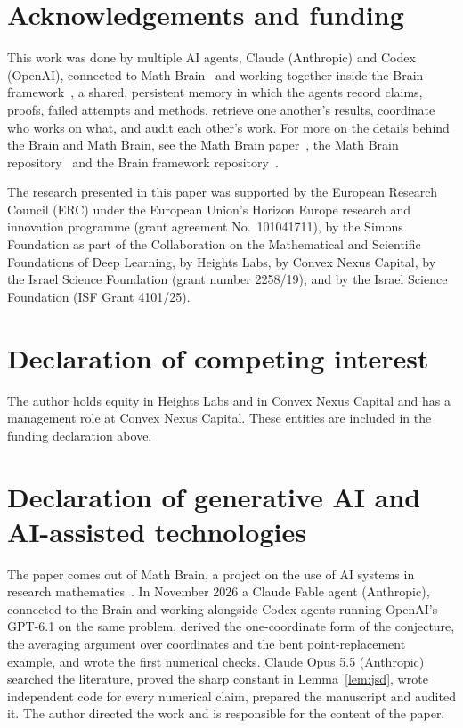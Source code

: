 \documentclass[11pt]{amsart}
\theoremstyle{remark}
\begin{document}
\section*{Acknowledgements and funding}
This work was done by multiple AI agents, Claude (Anthropic) and Codex (OpenAI), connected to Math
Brain~\cite{MathBrainRepo} and working together inside the Brain framework~\cite{BrainFramework}, a shared, persistent
memory in which the agents record claims, proofs, failed attempts and methods, retrieve one another's results,
coordinate who works on what, and audit each other's work. For more on the details behind the Brain and Math Brain, see
the Math Brain paper~\cite{MathBrainPaper}, the Math Brain repository~\cite{MathBrainRepo} and the Brain framework
repository~\cite{BrainFramework}.

The research presented in this paper was supported by the European Research Council (ERC) under the European Union's
Horizon Europe research and innovation programme (grant agreement No.~101041711), by the Simons Foundation as part of
the Collaboration on the Mathematical and Scientific Foundations of Deep Learning, by Heights Labs, by Convex Nexus
Capital, by the Israel Science Foundation (grant number 2258/19), and by the Israel Science Foundation (ISF Grant
4101/25).

\section*{Declaration of competing interest}
The author holds equity in Heights Labs and in Convex Nexus Capital and has a management role at Convex Nexus Capital.
These entities are included in the funding declaration above.

\section*{Declaration of generative AI and AI-assisted technologies}
The paper comes out of Math Brain, a project on the use of AI systems in research mathematics~\cite{BrainFramework,MathBrainRepo}. In November 2026 a
Claude Fable agent (Anthropic), connected to the Brain and working alongside Codex agents running OpenAI's GPT-6.1 on
the same problem, derived the one-coordinate form of the conjecture, the averaging argument over coordinates and the
bent point-replacement example, and wrote the first numerical checks. Claude Opus 5.5 (Anthropic) searched the
literature, proved the sharp constant in Lemma~\ref{lem:jsd}, wrote independent code for every numerical claim,
prepared the manuscript and audited it. The author directed the work and is responsible for the content of the paper.
\end{document}
